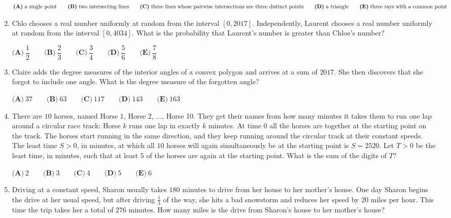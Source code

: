 \documentclass{article}
\begin{document}
\begin{enumerate}[label=\arabic*., itemsep=0.5em]
$ \textbf{(A)}\ \text{a single point} \qquad\textbf{(B)}\ \text{two intersecting lines} \\ \qquad\textbf{(C)}\ \text{three lines whose pairwise intersections are three distinct points} \\ \qquad\textbf{(D)}\ \text{a triangle}\qquad\textbf{(E)}\ \text{three rays with a common point} $\par \vspace{0.5em}\item Chlo chooses a real number uniformly at random from the interval $ [ 0,2017 ]$. Independently, Laurent chooses a real number uniformly at random from the interval $[ 0 , 4034 ]$. What is the probability that Laurent's number is greater than Chloe's number?  

$ \textbf{(A)}\ \dfrac{1}{2} \qquad\textbf{(B)}\ \dfrac{2}{3} \qquad\textbf{(C)}\ \dfrac{3}{4} \qquad\textbf{(D)}\ \dfrac{5}{6} \qquad\textbf{(E)}\ \dfrac{7}{8} $\par \vspace{0.5em}\item Claire adds the degree measures of the interior angles of a convex polygon and arrives at a sum of $2017$. She then discovers that she forgot to include one angle. What is the degree measure of the forgotten angle?

$\textbf{(A)}\ 37\qquad\textbf{(B)}\ 63\qquad\textbf{(C)}\ 117\qquad\textbf{(D)}\ 143\qquad\textbf{(E)}\ 163$\par \vspace{0.5em}\item There are $10$ horses, named Horse 1, Horse 2, $\ldots$, Horse 10. They get their names from how many minutes it takes them to run one lap around a circular race track: Horse $k$ runs one lap in exactly $k$ minutes. At time 0 all the horses are together at the starting point on the track. The horses start running in the same direction, and they keep running around the circular track at their constant speeds. The least time $S > 0$, in minutes, at which all $10$ horses will again simultaneously be at the starting point is $S = 2520$. Let  $T>0$ be the least time, in minutes, such that at least $5$ of the horses are again at the starting point. What is the sum of the digits of  $T$?

$\textbf{(A)}\ 2\qquad\textbf{(B)}\ 3\qquad\textbf{(C)}\ 4\qquad\textbf{(D)}\ 5\qquad\textbf{(E)}\ 6$\par \vspace{0.5em}\item Driving at a constant speed, Sharon usually takes $180$ minutes to drive from her house to her mother's house. One day Sharon begins the drive at her usual speed, but after driving $\frac{1}{3}$ of the way, she hits a bad snowstorm and reduces her speed by $20$ miles per hour. This time the trip takes her a total of $276$ minutes. How many miles is the drive from Sharon's house to her mother's house?


\end{enumerate}
\end{document}
